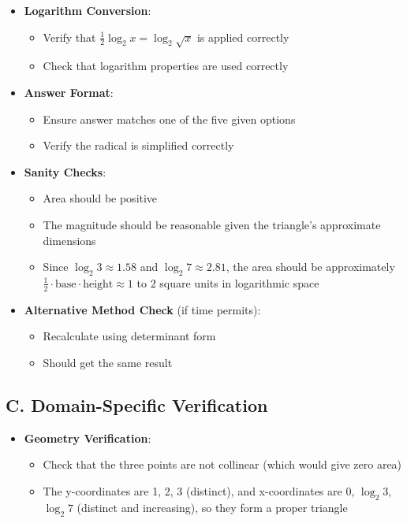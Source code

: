 \documentclass[12pt]{article}
\begin{document}
\begin{verificationbox}
\begin{itemize}[leftmargin=*]
    \item \textbf{Logarithm Conversion}:
    \begin{itemize}
        \item Verify that $\frac{1}{2}\log_2 x = \log_2 \sqrt{x}$ is applied correctly
        \item Check that logarithm properties are used correctly
    \end{itemize}
    
    \item \textbf{Answer Format}:
    \begin{itemize}
        \item Ensure answer matches one of the five given options
        \item Verify the radical is simplified correctly
    \end{itemize}
    
    \item \textbf{Sanity Checks}:
    \begin{itemize}
        \item Area should be positive
        \item The magnitude should be reasonable given the triangle's approximate dimensions
        \item Since $\log_2 3 \approx 1.58$ and $\log_2 7 \approx 2.81$, the area should be approximately $\frac{1}{2} \cdot \text{base} \cdot \text{height} \approx 1$ to $2$ square units in logarithmic space
    \end{itemize}
    
    \item \textbf{Alternative Method Check} (if time permits):
    \begin{itemize}
        \item Recalculate using determinant form
        \item Should get the same result
    \end{itemize}
\end{itemize}

\subsection*{C. Domain-Specific Verification}
\begin{itemize}[leftmargin=*]
    \item \textbf{Geometry Verification}:
    \begin{itemize}
        \item Check that the three points are not collinear (which would give zero area)
        \item The y-coordinates are 1, 2, 3 (distinct), and x-coordinates are 0, $\log_2 3$, $\log_2 7$ (distinct and increasing), so they form a proper triangle
    \end{itemize}
    

\end{itemize}
\end{verificationbox}
\end{document}
